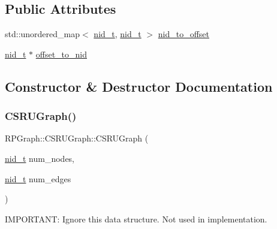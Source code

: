 \subsection*{Public Attributes}
\begin{DoxyCompactItemize}
\item 
std\+::unordered\+\_\+map$<$ \mbox{\hyperlink{namespaceRPGraph_ab3ae34f1ab88e48f43794c30c8697b74}{nid\+\_\+t}}, \mbox{\hyperlink{namespaceRPGraph_ab3ae34f1ab88e48f43794c30c8697b74}{nid\+\_\+t}} $>$ \mbox{\hyperlink{classRPGraph_1_1CSRUGraph_a4d831eac19d0c676ff02e542250d429c}{nid\+\_\+to\+\_\+offset}}
\item 
\mbox{\hyperlink{namespaceRPGraph_ab3ae34f1ab88e48f43794c30c8697b74}{nid\+\_\+t}} $\ast$ \mbox{\hyperlink{classRPGraph_1_1CSRUGraph_ad59e162f4c9eeac87a0fbd5d3c054dbe}{offset\+\_\+to\+\_\+nid}}
\end{DoxyCompactItemize}


\subsection{Constructor \& Destructor Documentation}
\mbox{\label{classRPGraph_1_1CSRUGraph_a78cc1f4446190dcd347edc6bfaa4c1b8}} 
\subsubsection{\texorpdfstring{C\+S\+R\+U\+Graph()}{CSRUGraph()}}
{\footnotesize\ttfamily R\+P\+Graph\+::\+C\+S\+R\+U\+Graph\+::\+C\+S\+R\+U\+Graph (\begin{DoxyParamCaption}\item[{\mbox{\hyperlink{namespaceRPGraph_ab3ae34f1ab88e48f43794c30c8697b74}{nid\+\_\+t}}}]{num\+\_\+nodes,  }\item[{\mbox{\hyperlink{namespaceRPGraph_ab3ae34f1ab88e48f43794c30c8697b74}{nid\+\_\+t}}}]{num\+\_\+edges }\end{DoxyParamCaption})}

I\+M\+P\+O\+R\+T\+A\+NT\+: Ignore this data structure. Not used in implementation. \mbox{\label{classRPGraph_1_1CSRUGraph_a3e6cc9a4ef614b841519df3ea5d3715b}} 
